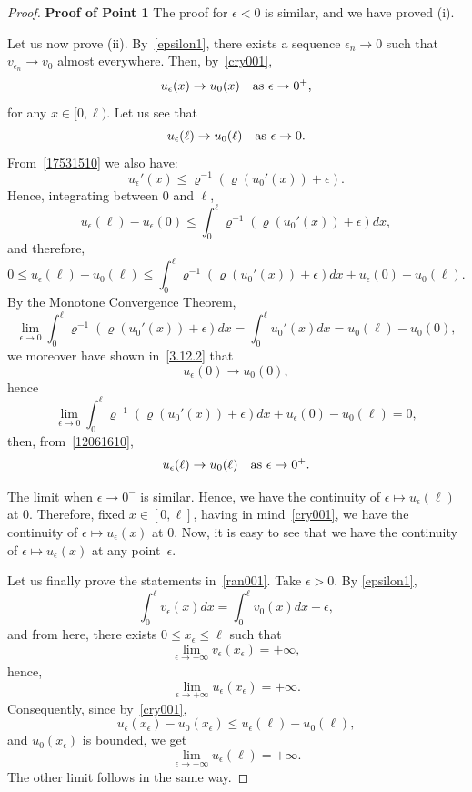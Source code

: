 \documentclass[reqno,12pt]{amsart}
\numberwithin{equation}{section} %
\begin{document}
\begin{proof}  {\bf Proof of Point 1}
 The proof for $\epsilon<0$ is similar, and we have proved (i). 
 
 Let us now prove  (ii). By~\eqref{epsilon1}, there exists a  sequence $\epsilon_n\to 0$ such that $v_{\epsilon_n}\to v_0$ almost everywhere. Then, by~\eqref{cry001}, 
\begin{equation}\label{3.12.2}u_\epsilon(x)\to u_0(x)\quad\hbox{as }\epsilon\to 0^+,
\end{equation}
for any $x\in[0,\ell)$. 
Let us see that $$u_\epsilon(\ell)\to u_0(\ell)\quad\hbox{as }\epsilon\to 0.$$ 
From~\eqref{17531510} we also have: 
\begin{equation}\label{conv0003}
u_\epsilon'(x)\le \varrho^{-1}(\varrho(u_0'(x))+\epsilon).
\end{equation}
 Hence, integrating between $0$ and $\ell$,
 $$ u_\epsilon(\ell) - u_\epsilon(0)\le \int_0^\ell \varrho^{-1}(\varrho(u_0'(x))+\epsilon)dx,$$
 and therefore,
 \begin{equation}\label{12061610}
0\le u_\epsilon(\ell) - u_0(\ell)\le \int_0^\ell \varrho^{-1}(\varrho(u_0'(x))+\epsilon)dx+u_\epsilon(0)-u_0(\ell).
\end{equation}
By the  Monotone Convergence Theorem, 
 $$\lim_{\epsilon\to 0}\int_0^\ell \varrho^{-1}(\varrho(u_0'(x))+\epsilon)dx=\int_0^\ell u_0'(x)dx=u_0(\ell)-u_0(0),$$
we moreover have shown in~\eqref{3.12.2} that  $$u_\epsilon(0)\to u_0(0),$$   hence
 $$ 
 \displaystyle\lim_{\epsilon\to 0}\int_0^\ell \varrho^{-1}(\varrho(u_0'(x))+\epsilon)dx+u_\epsilon(0)-u_0(\ell)=0,
 $$
 then, from~\eqref{12061610},
 $$u_\epsilon(\ell)\to u_0(\ell)\quad\hbox{as }\epsilon\to 0^+.$$
 
The limit when  $\epsilon\to 0^-$ is similar.   Hence, we have  the continuity of $\epsilon\mapsto u_\epsilon(\ell)$ at $0$. Therefore,  fixed $x\in[0,\ell]$, having in mind~\eqref{cry001},   we have  the continuity of $\epsilon\mapsto u_\epsilon(x)$ at $0$. Now, it is easy to see that we have the continuity of $\epsilon\mapsto u_\epsilon(x)$ at any point~$\epsilon$.  
   

Let us finally prove the  statements in~\eqref{ran001}.   Take $\epsilon>0$.      By \eqref{epsilon1},
$$\int_0^\ell v_\epsilon(x)dx=\int_0^\ell v_0(x)dx+\epsilon,$$ and from here, there exists $0\le x_\epsilon\le\ell$ such that 
$$\lim_{\epsilon\to+\infty}v_\epsilon(x_\epsilon)=+\infty,$$
hence, 
$$\lim_{\epsilon\to+\infty}u_\epsilon(x_\epsilon)=+\infty.$$
Consequently,   since  by~\eqref{cry001},
$$  u_\epsilon(x_\epsilon) - u_0(x_\epsilon)\le u_\epsilon(\ell) - u_0(\ell),$$
and $u_0(x_\epsilon)$ is bounded, we get 
$$\lim_{\epsilon\to+\infty}u_\epsilon(\ell)=+\infty.$$
The other limit  follows in the same way.


\end{proof}
\end{document}

